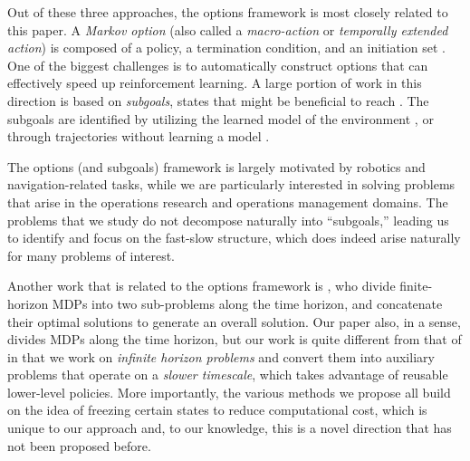 \documentclass[11pt, notitlepage]{article}
\newcommand{\1}{\mathbbm{1}}
\begin{document}
Out of these three approaches, the options framework is most closely related to this paper.
A \emph{Markov option} (also called a \emph{macro-action} or \emph{temporally extended action}) is composed of a policy,
a termination condition, %
and an initiation set %
\citep{sutton1999between, precup2000temporal}. 
One of the biggest challenges is to automatically construct options that can effectively speed up reinforcement learning. 
A large portion of work in this direction is based on \emph{subgoals}, states that might be beneficial to reach \citep{digney1998learning, mcgovern2001automatic, jonsson2005causal, ciosek2015value, wang2022subgoal}. 
The subgoals are identified by utilizing the learned model of the environment \citep{menache2002q, mannor2004dynamic, csimcsek2004using, csimcsek2005identifying}, or through trajectories without learning a model \citep{mcgovern2001automatic, stolle2002learning}.

The options (and subgoals) framework is largely motivated by robotics and navigation-related tasks, while we are particularly interested in solving problems that arise in the operations research and operations management domains. The problems that we study do not decompose naturally into ``subgoals,'' leading us to identify and focus on the fast-slow structure, which does indeed arise naturally for many problems of interest. 


Another work that is related to the options framework is \citet{song2020temporal}, who divide finite-horizon MDPs into two sub-problems along the time horizon, and concatenate their optimal solutions to generate an overall solution. Our paper also, in a sense, divides MDPs along the time horizon, but our work is quite different from that of \citet{song2020temporal} in that we work on \emph{infinite horizon problems} and convert them into auxiliary problems that operate on a \emph{slower timescale}, which takes advantage of reusable lower-level policies. More importantly, the various methods we propose all build on the idea of freezing certain states to reduce computational cost, which is unique to our approach and, to our knowledge, this is a novel direction that has not been proposed before.
\end{document}

